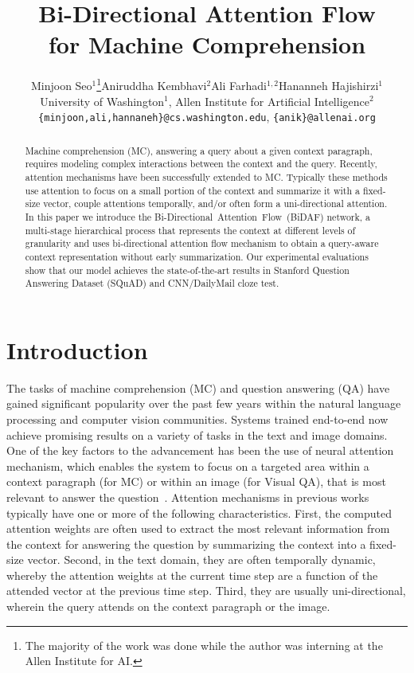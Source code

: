 \documentclass{article} \usepackage{iclr2017_conference,times}
\title{Bi-Directional Attention Flow \\
for Machine Comprehension}
\author{Minjoon Seo$^1$\thanks{The majority of the work was done while the author was interning at the Allen Institute for AI.}\qquad Aniruddha Kembhavi$^2$\qquad Ali Farhadi$^{1,2}$\qquad Hananneh Hajishirzi$^1$ \\
University of Washington$^1$, Allen Institute for Artificial Intelligence$^2$\\
\texttt{\{minjoon,ali,hannaneh\}@cs.washington.edu}, \texttt{\{anik\}@allenai.org}\\
}
\newcommand{\sys}{\mbox{Bi-Directional Attention Flow}}
\newcommand{\sysshort}{\mbox{\sc BiDAF}}
\begin{document}
\maketitle

\begin{abstract}
Machine comprehension (MC), answering a query about a given context paragraph, requires modeling complex interactions between the context and the query. Recently, attention mechanisms have been successfully extended to MC. Typically these methods use attention to focus on a small portion of the context and summarize it with a fixed-size vector, couple attentions temporally, and/or often form a uni-directional attention. 
In this paper we introduce the \sys\ (\sysshort) network, a multi-stage hierarchical process that represents the context at different levels of granularity and uses bi-directional attention flow mechanism to obtain a query-aware context representation without early summarization. 
Our experimental evaluations show that our  model achieves the state-of-the-art results in Stanford Question Answering Dataset (SQuAD) and CNN/DailyMail cloze test. 

\end{abstract}

\section{Introduction}\label{sec:intro}
The tasks of machine comprehension (MC) and question answering (QA) have gained significant popularity over the past few years within the natural language processing and computer vision communities. Systems trained end-to-end now achieve promising results on a variety of tasks in the text and image domains. 
One of the key factors to the advancement has been the use of neural attention mechanism, which enables the system to focus on a targeted area within a context paragraph (for MC) or within an image (for Visual QA), that is most relevant to answer the question~\citep{memnn,antol2015vqa,xiong2016dynamic}. 
Attention mechanisms in previous works typically have one or more of the following characteristics. 
First, the computed attention weights are often used to extract the most relevant information from the context for answering the question by summarizing the context into a fixed-size vector.
Second, in the text domain, they are often temporally dynamic, whereby the attention weights at the current time step are a function of the attended vector at the previous time step. 
Third, they are usually uni-directional, wherein the query attends on the context paragraph or the image. 
\end{document}
